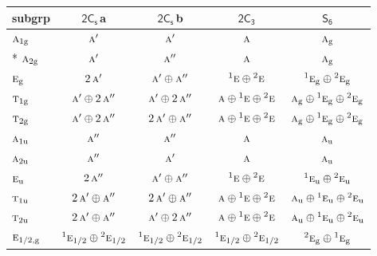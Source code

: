 \documentclass[10pt,a4paper]{article}
\numberwithin{equation}{section}
\newcommand{\grp}[1]{\mathsf{#1}}
\newcommand{\irr}[1]{\text{\normalfont\scshape #1}}
\newcommand{\conjpair}[1]{{}^{#1}}
\newcommand{\ptag}[1]{\mathrm{#1}}
\newcommand{\clsletter}[1]{\,{\scriptsize\color{black!55}#1}}
\begin{document}
{\small\begin{longtable}{@{}lcccc@{}}\toprule
subgrp & \href{2C1v.pdf}{$\grp{2C_{s}}$}\clsletter{a} & \href{2C1v.pdf}{$\grp{2C_{s}}$}\clsletter{b} & \href{2C3.pdf}{$\grp{2C_{3}}$} & \href{S6.pdf}{$\grp{S_{6}}$}\\\midrule\endhead
\bottomrule\endfoot\endlastfoot
$\irr{a}_{1\ptag{g}}$ & $\irr{a}'$ & $\irr{a}'$ & $\irr{a}$ & $\irr{a}_{\ptag{g}}$\\*
$\irr{a}_{2\ptag{g}}$ & $\irr{a}'$ & $\irr{a}''$ & $\irr{a}$ & $\irr{a}_{\ptag{g}}$\\
$\irr{e}_{\ptag{g}}$ & $2\,\irr{a}'$ & $\irr{a}'\oplus \irr{a}''$ & $\conjpair{1}\irr{e}\oplus \conjpair{2}\irr{e}$ & $\conjpair{1}\irr{e}_{\ptag{g}}\oplus \conjpair{2}\irr{e}_{\ptag{g}}$\\
$\irr{t}_{1\ptag{g}}$ & $\irr{a}'\oplus 2\,\irr{a}''$ & $\irr{a}'\oplus 2\,\irr{a}''$ & $\irr{a}\oplus \conjpair{1}\irr{e}\oplus \conjpair{2}\irr{e}$ & $\irr{a}_{\ptag{g}}\oplus \conjpair{1}\irr{e}_{\ptag{g}}\oplus \conjpair{2}\irr{e}_{\ptag{g}}$\\
$\irr{t}_{2\ptag{g}}$ & $\irr{a}'\oplus 2\,\irr{a}''$ & $2\,\irr{a}'\oplus \irr{a}''$ & $\irr{a}\oplus \conjpair{1}\irr{e}\oplus \conjpair{2}\irr{e}$ & $\irr{a}_{\ptag{g}}\oplus \conjpair{1}\irr{e}_{\ptag{g}}\oplus \conjpair{2}\irr{e}_{\ptag{g}}$\\
$\irr{a}_{1\ptag{u}}$ & $\irr{a}''$ & $\irr{a}''$ & $\irr{a}$ & $\irr{a}_{\ptag{u}}$\\
$\irr{a}_{2\ptag{u}}$ & $\irr{a}''$ & $\irr{a}'$ & $\irr{a}$ & $\irr{a}_{\ptag{u}}$\\
$\irr{e}_{\ptag{u}}$ & $2\,\irr{a}''$ & $\irr{a}'\oplus \irr{a}''$ & $\conjpair{1}\irr{e}\oplus \conjpair{2}\irr{e}$ & $\conjpair{1}\irr{e}_{\ptag{u}}\oplus \conjpair{2}\irr{e}_{\ptag{u}}$\\
$\irr{t}_{1\ptag{u}}$ & $2\,\irr{a}'\oplus \irr{a}''$ & $2\,\irr{a}'\oplus \irr{a}''$ & $\irr{a}\oplus \conjpair{1}\irr{e}\oplus \conjpair{2}\irr{e}$ & $\irr{a}_{\ptag{u}}\oplus \conjpair{1}\irr{e}_{\ptag{u}}\oplus \conjpair{2}\irr{e}_{\ptag{u}}$\\
$\irr{t}_{2\ptag{u}}$ & $2\,\irr{a}'\oplus \irr{a}''$ & $\irr{a}'\oplus 2\,\irr{a}''$ & $\irr{a}\oplus \conjpair{1}\irr{e}\oplus \conjpair{2}\irr{e}$ & $\irr{a}_{\ptag{u}}\oplus \conjpair{1}\irr{e}_{\ptag{u}}\oplus \conjpair{2}\irr{e}_{\ptag{u}}$\\
$\irr{e}_{1/2,\ptag{g}}$ & $\conjpair{1}\irr{e}_{1/2}\oplus \conjpair{2}\irr{e}_{1/2}$ & $\conjpair{1}\irr{e}_{1/2}\oplus \conjpair{2}\irr{e}_{1/2}$ & $\conjpair{1}\irr{e}_{1/2}\oplus \conjpair{2}\irr{e}_{1/2}$ & $\conjpair{2}\irr{e}_{\ptag{g}}\oplus \conjpair{1}\irr{e}_{\ptag{g}}$\\

\end{longtable}}
\end{document}
